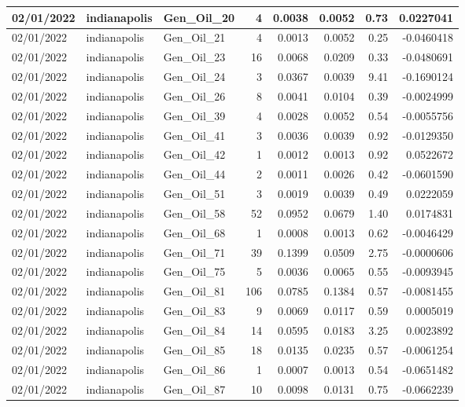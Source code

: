 \documentclass[
  letterpaper,
  DIV=11,
  numbers=noendperiod]{scrartcl}
\begin{document}
\begin{tabular}{l|l|l|r|r|r|r|r}
\hline
02/01/2022 & indianapolis & Gen\_Oil\_20 & 4 & 0.0038 & 0.0052 & 0.73 & 0.0227041\\
\hline
02/01/2022 & indianapolis & Gen\_Oil\_21 & 4 & 0.0013 & 0.0052 & 0.25 & -0.0460418\\
\hline
02/01/2022 & indianapolis & Gen\_Oil\_23 & 16 & 0.0068 & 0.0209 & 0.33 & -0.0480691\\
\hline
02/01/2022 & indianapolis & Gen\_Oil\_24 & 3 & 0.0367 & 0.0039 & 9.41 & -0.1690124\\
\hline
02/01/2022 & indianapolis & Gen\_Oil\_26 & 8 & 0.0041 & 0.0104 & 0.39 & -0.0024999\\
\hline
02/01/2022 & indianapolis & Gen\_Oil\_39 & 4 & 0.0028 & 0.0052 & 0.54 & -0.0055756\\
\hline
02/01/2022 & indianapolis & Gen\_Oil\_41 & 3 & 0.0036 & 0.0039 & 0.92 & -0.0129350\\
\hline
02/01/2022 & indianapolis & Gen\_Oil\_42 & 1 & 0.0012 & 0.0013 & 0.92 & 0.0522672\\
\hline
02/01/2022 & indianapolis & Gen\_Oil\_44 & 2 & 0.0011 & 0.0026 & 0.42 & -0.0601590\\
\hline
02/01/2022 & indianapolis & Gen\_Oil\_51 & 3 & 0.0019 & 0.0039 & 0.49 & 0.0222059\\
\hline
02/01/2022 & indianapolis & Gen\_Oil\_58 & 52 & 0.0952 & 0.0679 & 1.40 & 0.0174831\\
\hline
02/01/2022 & indianapolis & Gen\_Oil\_68 & 1 & 0.0008 & 0.0013 & 0.62 & -0.0046429\\
\hline
02/01/2022 & indianapolis & Gen\_Oil\_71 & 39 & 0.1399 & 0.0509 & 2.75 & -0.0000606\\
\hline
02/01/2022 & indianapolis & Gen\_Oil\_75 & 5 & 0.0036 & 0.0065 & 0.55 & -0.0093945\\
\hline
02/01/2022 & indianapolis & Gen\_Oil\_81 & 106 & 0.0785 & 0.1384 & 0.57 & -0.0081455\\
\hline
02/01/2022 & indianapolis & Gen\_Oil\_83 & 9 & 0.0069 & 0.0117 & 0.59 & 0.0005019\\
\hline
02/01/2022 & indianapolis & Gen\_Oil\_84 & 14 & 0.0595 & 0.0183 & 3.25 & 0.0023892\\
\hline
02/01/2022 & indianapolis & Gen\_Oil\_85 & 18 & 0.0135 & 0.0235 & 0.57 & -0.0061254\\
\hline
02/01/2022 & indianapolis & Gen\_Oil\_86 & 1 & 0.0007 & 0.0013 & 0.54 & -0.0651482\\
\hline
02/01/2022 & indianapolis & Gen\_Oil\_87 & 10 & 0.0098 & 0.0131 & 0.75 & -0.0662239\\

\end{tabular}
\end{document}
